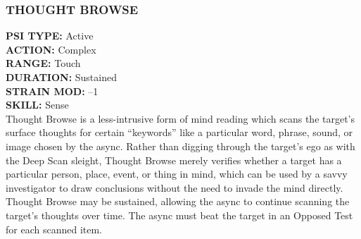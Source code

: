 \subsubsection{THOUGHT BROWSE} \textbf{PSI TYPE:} Active \\ \textbf{ACTION:} Complex \\ \textbf{RANGE:} Touch \\ \textbf{DURATION:} Sustained \\ \textbf{STRAIN MOD:} –1 \\ \textbf{SKILL:} Sense\\ Thought Browse is a less-intrusive form of mind reading which scans the target’s surface thoughts for certain “keywords” like a particular word, phrase, sound, or image chosen by the async. Rather than digging through the target’s ego as with the Deep Scan sleight, Thought Browse merely verifies whether a target has a particular person, place, event, or thing in mind, which can be used by a savvy investigator to draw conclusions without the need to invade the mind directly. Thought Browse may be sustained, allowing the async to continue scanning the target’s thoughts over time. The async must beat the target in an Opposed Test for each scanned item. 

